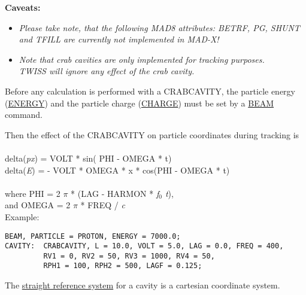 {\bf Caveats:}
\begin{itemize}
   \item \textit{ Please take note, that the following MAD8 attributes:
     BETRF, PG, SHUNT and TFILL are currently not implemented in MAD-X!}
   \item \textit{ Note that crab cavities are only implemented for
     tracking  purposes. \\ TWISS will ignore any effect of the crab cavity.  
% 
}
\end{itemize} 


Before any calculation is performed with a CRABCAVITY, the particle
energy (\href{beam.html#energy}{ENERGY}) and the particle charge
(\href{beam.html#charge}{CHARGE}) must be set by a
\href{beam.html}{BEAM} command.   

Then the effect of the CRABCAVITY on particle coordinates during tracking is
\\
\\ delta(\textit{px})  = VOLT * sin( PHI - OMEGA * t) 
\\ delta(\textit{E})  = -  VOLT * OMEGA * x * cos(PHI - OMEGA * t) 
\\ 
\\ where PHI =  2 $\pi$ * (LAG - HARMON * \textit{f$_0$ t}), 
\\ and OMEGA = 2 $\pi$ * FREQ / \textit{c}
\\


Example: 
\begin{verbatim}
BEAM, PARTICLE = PROTON, ENERGY = 7000.0;
CAVITY:  CRABCAVITY, L = 10.0, VOLT = 5.0, LAG = 0.0, FREQ = 400,
         RV1 = 0, RV2 = 50, RV3 = 1000, RV4 = 50, 
         RPH1 = 100, RPH2 = 500, LAGF = 0.125;
\end{verbatim} 

The \href{local_system.html#straight}{straight reference system} for a
cavity is a cartesian coordinate system.  
 
